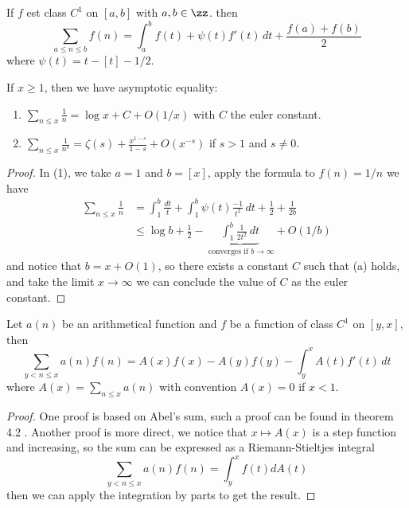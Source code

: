 \begin{theorem} \label{euler-maclaurin}
     If \(f\) est class \(C^1\) on \([a,b]\) with \(a,b \in \zz\). then 
    \[\sum_{a \leq n \leq b} f(n) = \int_a^{b}f(t) + \psi(t)f'(t) \,dt +\frac{f(a) + f(b)}{2}\]
where \(\psi(t) = t-[t]-1/2\).
    
\end{theorem}



\begin{colorexample}
    If \(x \geq 1\), then we have asymptotic equality:
    \begin{enumerate} [(1)]
        \item \(\sum_{n \leq x} \frac{1}{n}= \log x + C + O(1/x)\) with \(C\) the euler constant.
        \item \(\sum_{n \leq x} \frac{1}{n^s} = \zeta(s) + \frac{x^{1-s}}{1-s} + O(x^{-s})\) if \(s > 1\) and \(s \neq 0\).
    \end{enumerate}
\end{colorexample}

\begin{proof}
    In (1), we take \(a = 1\) and \(b  = [x]\), apply the formula to \(f(n) = 1/n\) we have
    \begin{align*}
        \sum_{n \leq x} \frac{1}{n} &= \int_{1}^b \frac{dt}{t} + \int_1^b \psi(t)\frac{-1}{t^2} \,dt + \frac{1}{2}+ \frac{1}{2b} \\
        &\leq \log b + \frac{1}{2} - \underbrace{\int_1^b \frac{1}{2t^2} \,dt}_{\text{ converges if } b \to \infty} + O(1/b)
    \end{align*}
    and notice that \(b = x + O(1)\), so there exists a constant \(C\) such that (a) holds, and take the limit \(x \to \infty\) we can conclude the value of \(C\) as the euler constant.
\end{proof}

\begin{theorem}[Abel]
    Let \(a(n)\) be an arithmetical function and \(f\) be a function of class \(C^1\) on \([y,x]\), then 
    \[\sum_{y < n \leq x} a(n)f(n) = A(x)f(x) - A(y)f(y) - \int_{y}^x A(t)f'(t) \,dt\] 
    where \(A(x) = \sum_{n \leq x}a(n)\) with convention \(A(x) = 0\) if \(x<1\).  
\end{theorem}

\begin{proof}
    One proof is based on Abel's sum, such a proof can be found in theorem 4.2 \cite{Apostol}. Another proof is more direct, we notice that \(x \mapsto A(x)\) is a step function and increasing, so the sum can be expressed as a Riemann-Stieltjes integral
    \[\sum_{y < n \leq x} a(n)f(n) = \int_{y}^x f(t) dA(t)\]
    then we can apply the integration by parts to get the result. 
\end{proof}

